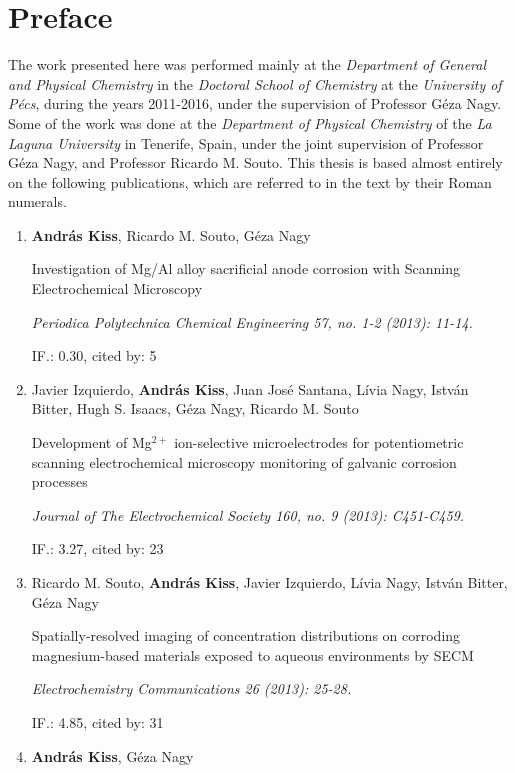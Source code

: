 \chapter*{Preface}
The work presented here was performed mainly at the \emph{Department of General and Physical Chemistry} in the \emph{Doctoral School of Chemistry} at the \emph{University of Pécs}, during the years 2011-2016, under the supervision of Professor Géza Nagy.
Some of the work was done at the \emph{Department of Physical Chemistry} of the \emph{La Laguna University} in Tenerife, Spain, under the joint supervision of Professor Géza Nagy, and Professor Ricardo M. Souto.
This thesis is based almost entirely on the following publications, which are referred to in the text by their Roman numerals.

\begin{enumerate}
\item \textbf{András Kiss}, Ricardo M. Souto, Géza Nagy

Investigation of Mg/Al alloy sacrificial anode corrosion with Scanning Electrochemical Microscopy

\emph{Periodica Polytechnica Chemical Engineering 57, no. 1-2 (2013): 11-14.}

IF.: 0.30, cited by: 5

\item Javier Izquierdo, \textbf{András Kiss}, Juan José Santana, Lívia Nagy, István Bitter, Hugh S. Isaacs, Géza Nagy, Ricardo M. Souto

Development of Mg$^{2+}$ ion-selective microelectrodes for potentiometric scanning electrochemical microscopy monitoring of galvanic corrosion processes

\emph{Journal of The Electrochemical Society 160, no. 9 (2013): C451-C459.}

IF.: 3.27, cited by: 23

\item Ricardo M. Souto, \textbf{András Kiss}, Javier Izquierdo, Lívia Nagy, István Bitter, Géza Nagy

Spatially-resolved imaging of concentration distributions on corroding mag\-ne\-si\-um-based materials exposed to aqueous environments by SECM

\emph{Electrochemistry Communications 26 (2013): 25-28.}

IF.: 4.85, cited by: 31

\newpage
\item \textbf{András Kiss}, Géza Nagy


\end{enumerate}

